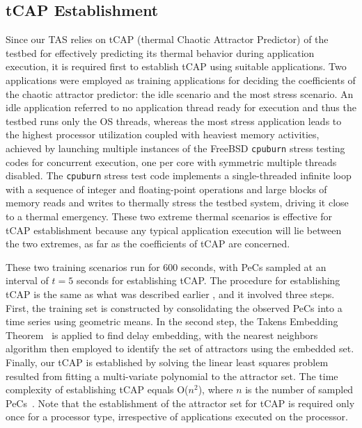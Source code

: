 \documentclass[times, 10pt,twocolumn]{IEEEtran}
\begin{document}
\subsection{tCAP Establishment}
\label{sec:callibration}
Since our TAS relies on tCAP (thermal Chaotic Attractor Predictor) of
the testbed for effectively predicting its thermal behavior during
application execution, it is required first to establish tCAP using
suitable applications.  Two applications were employed as training
applications for deciding the coefficients of the chaotic attractor
predictor: the idle scenario and the most stress scenario.  An idle
application referred to no application thread ready for execution and
thus the testbed runs only the OS threads, whereas the most stress
application leads to the highest processor utilization coupled with
heaviest memory activities, achieved by launching multiple instances of
the FreeBSD \texttt{cpuburn} stress testing codes for concurrent
execution, one per core with symmetric multiple threads disabled.  The
\texttt{cpuburn} stress test code implements a single-threaded infinite
loop with a sequence of integer and floating-point operations and large
blocks of memory reads and writes to thermally stress the testbed
system, driving it close to a thermal emergency.  These two extreme
thermal scenarios is effective for tCAP establishment because any
typical application execution will lie between the two extremes, as far
as the coefficients of tCAP are concerned.

These two training scenarios run for 600 seconds, with PeCs sampled at
an interval of $t=5$ seconds for establishing tCAP.  The procedure for
establishing tCAP is the same as what was described earlier
\cite{Lewis2010}, and it involved three steps. First, the training set
is constructed by consolidating the observed PeCs into a time series
using geometric means.  In the second step, the Takens Embedding
Theorem~\cite{Su2010} is applied to find delay embedding, with the
nearest neighbors algorithm then employed to identify the set of
attractors using the embedded set.  Finally, our tCAP is established by
solving the linear least squares problem resulted from fitting a
multi-variate polynomial to the attractor set.  The time complexity of
establishing tCAP equals O($n ^2$), where $n$ is the number of sampled
PeCs~\cite{Lewis2010}.  Note that the establishment of the attractor set
for tCAP is required only once for a processor type, irrespective of
applications executed on the processor.
\end{document}
